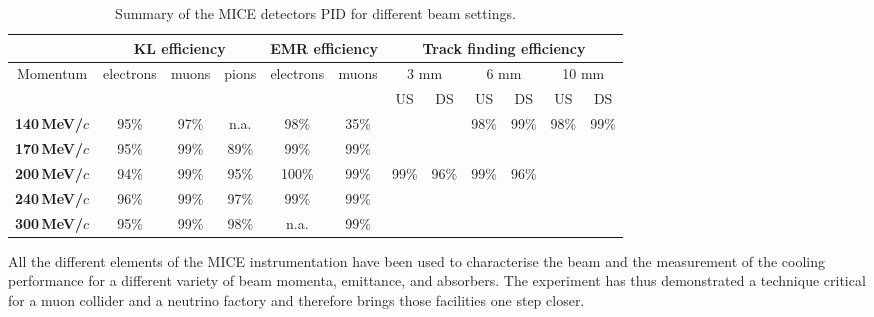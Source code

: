 \begin{table}[htb!]
\begin{tabular}{c|ccc|cc|cc|cc|cc}
 &
  \multicolumn{3}{c|}{\textbf{KL efficiency}} &
  \multicolumn{2}{c|}{\textbf{EMR efficiency}} &
  \multicolumn{6}{c}{\textbf{Track finding efficiency}} \\ 
  \hline
  \multirow{2}{*}{Momentum} &
  \multirow{2}{*}{electrons} &
  \multirow{2}{*}{muons} &
  \multirow{2}{*}{pions} &
  \multirow{2}{*}{electrons} &
  \multirow{2}{*}{muons} &
  \multicolumn{2}{c|}{3 mm} &
  \multicolumn{2}{c|}{6 mm} &
  \multicolumn{2}{c}{10 mm} \\  
             &      &      &      &       &      & US   & DS   & US   & DS   & US   & DS   \\ \hline
\textbf{140\,MeV/$c$} & 95\% & 97\% & n.a. & 98\%  & 35\% &      &      & 98\% & 99\% & 98\% & 99\% \\ \hline
\textbf{170\,MeV/$c$} & 95\% & 99\% & 89\% & 99\%  & 99\% &      &      &      &      &      &      \\ \hline
\textbf{200\,MeV/$c$} & 94\% & 99\% & 95\% & 100\% & 99\% & 99\% & 96\% & 99\% & 96\% &      &      \\ \hline
\textbf{240\,MeV/$c$} & 96\% & 99\% & 97\% & 99\%  & 99\% &      &      &      &      &      &      \\ \hline
\textbf{300\,MeV/$c$} & 95\% & 99\% & 98\% & n.a.  & 99\% &      &      &      &      &      &     
\end{tabular}
	\caption{Summary of the MICE detectors PID for different beam settings.}
	\label{tab:pid2}
\end{table}
All the different elements of the MICE instrumentation have been used to characterise the beam and the measurement of the cooling performance for a different variety of beam momenta, emittance, and absorbers.
The experiment has thus demonstrated a technique critical for a muon collider and a neutrino factory and therefore brings those facilities one step closer.
